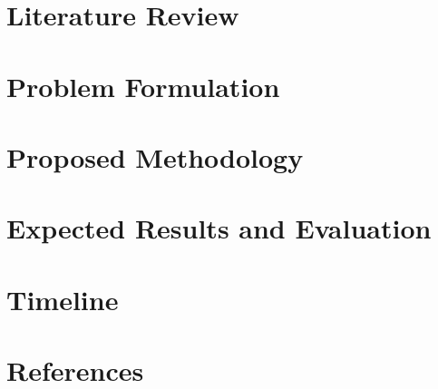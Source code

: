 \documentclass{article}
\begin{document}
\begin{normalsize}
	   	\section{Literature Review}
    	\section{Problem Formulation}
        \section{Proposed Methodology}
        \section{Expected Results and Evaluation}
        \section{Timeline}
        \section{References}
    \end{normalsize}

  
\end{document}
